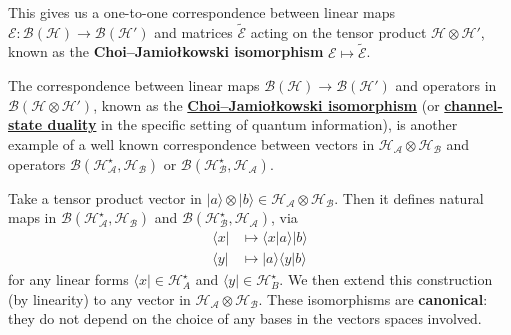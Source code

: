 \documentclass[fleqn]{article}
\newenvironment{technical}{\noindent}{\medskip}
\begin{document}
This gives us a one-to-one correspondence between linear maps \(\mathcal{E}\colon\mathcal{B}(\mathcal{H})\to\mathcal{B}(\mathcal{H}')\) and matrices \(\widetilde{\mathcal{E}}\) acting on the tensor product \(\mathcal{H}\otimes\mathcal{H}'\), known as the \textbf{Choi--Jamiołkowski isomorphism} \(\mathcal{E}\mapsto\widetilde{\mathcal{E}}\).

\begin{technical}
The correspondence between linear maps \(\mathscr{B}(\mathcal{H})\to\mathscr{B}(\mathcal{H'})\) and operators in \(\mathscr{B}(\mathcal{H}\otimes\mathcal{H'})\), known as the \href{https://en.wikipedia.org/wiki/Choi\%E2\%80\%93Jamio\%C5\%82kowski_isomorphism}{\textbf{Choi--Jamiołkowski isomorphism}} (or \href{https://en.wikipedia.org/wiki/Channel-state_duality}{\textbf{channel-state duality}} in the specific setting of quantum information), is another example of a well known correspondence between vectors in \(\mathcal{H}_{\mathcal{A}}\otimes\mathcal{H}_{\mathcal{B}}\) and operators \(\mathscr{B}(\mathcal{H}_{\mathcal{A}}^\star,\mathcal{H}_{\mathcal{B}})\) or \(\mathscr{B}(\mathcal{H}_{\mathcal{B}}^\star,\mathcal{H}_{\mathcal{A}})\).

Take a tensor product vector in \(|a\rangle\otimes|b\rangle\in \mathcal{H}_{\mathcal{A}}\otimes\mathcal{H}_{\mathcal{B}}\).
Then it defines natural maps in \(\mathscr{B}(\mathcal{H}_{\mathcal{A}}^\star,\mathcal{H}_{\mathcal{B}})\) and \(\mathscr{B}(\mathcal{H}_{\mathcal{B}}^\star,\mathcal{H}_{\mathcal{A}})\), via
\[
  \begin{aligned}
    \langle x|
    &\longmapsto \langle x|a\rangle|b\rangle
  \\\langle y|
    &\longmapsto |a\rangle\langle y|b\rangle
  \end{aligned}
\]
for any linear forms \(\langle x|\in\mathcal{H}^\star_A\) and \(\langle y|\in\mathcal{H}^\star_B\).
We then extend this construction (by linearity) to any vector in \(\mathcal{H}_{\mathcal{A}}\otimes\mathcal{H}_{\mathcal{B}}\).
These isomorphisms are \textbf{canonical}: they do not depend on the choice of any bases in the vectors spaces involved.


\end{technical}
\end{document}
